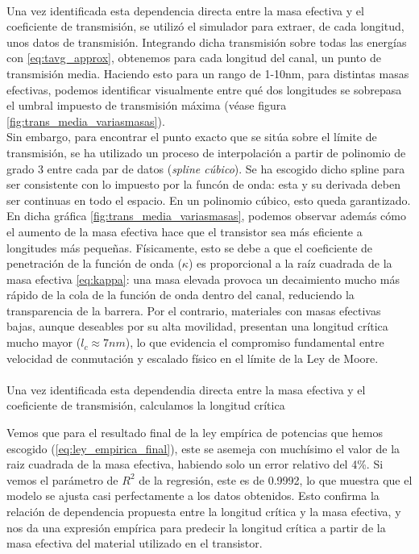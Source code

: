 \paragraph{} Una vez identificada esta dependencia directa entre la masa efectiva y el coeficiente de transmisión, se utilizó el simulador para extraer, de cada longitud, unos datos de transmisión. Integrando dicha transmisión sobre todas las energías con \ref{eq:tavg_approx}, obtenemos para cada longitud del canal, un punto de transmisión media. Haciendo esto para un rango de 1-10nm, para distintas masas efectivas, podemos identificar visualmente entre qué dos longitudes se sobrepasa el umbral impuesto de transmisión máxima (véase figura \ref{fig:trans_media_variasmasas}).\\
Sin embargo, para encontrar el punto exacto que se sitúa sobre el límite de transmisión, se ha utilizado un proceso de interpolación a partir de polinomio de grado 3 entre cada par de datos (\textit{spline cúbico}). Se ha escogido dicho spline para ser consistente con lo impuesto por la funcón de onda: esta y su derivada deben ser continuas en todo el espacio. En un polinomio cúbico, esto queda garantizado. \\

En dicha gráfica \ref{fig:trans_media_variasmasas}, podemos observar además cómo el aumento de la masa efectiva hace que el transistor sea más eficiente a longitudes más pequeñas. Físicamente, esto se debe a que el coeficiente de penetración de la función de onda ($\kappa$) es proporcional a la raíz cuadrada de la masa efectiva \ref{eq:kappa}: una masa elevada provoca un decaimiento mucho más rápido de la cola de la función de onda dentro del canal, reduciendo la transparencia de la barrera. Por el contrario, materiales con masas efectivas bajas, aunque deseables por su alta movilidad, presentan una longitud crítica mucho mayor ($l_c \approx 7nm$), lo que evidencia el compromiso fundamental entre velocidad de conmutación y escalado físico en el límite de la Ley de Moore.

\paragraph{}Una vez identificada esta dependendia directa entre la masa efectiva y el coeficiente de transmisión, calculamos la longitud crítica 


Vemos que para el resultado final de la ley empírica de potencias que hemos escogido (\ref{eq:ley_empirica_final}), este se asemeja con muchísimo el valor de la raiz cuadrada de la masa efectiva, habiendo solo un error relativo del 4\%. Si vemos el parámetro de $R^2$ de la regresión, este es de 0.9992, lo que muestra que el modelo se ajusta casi perfectamente a los datos obtenidos. Esto confirma la relación de dependencia propuesta entre la longitud crítica y la masa efectiva, y nos da una expresión empírica para predecir la longitud crítica a partir de la masa efectiva del material utilizado en el transistor.


